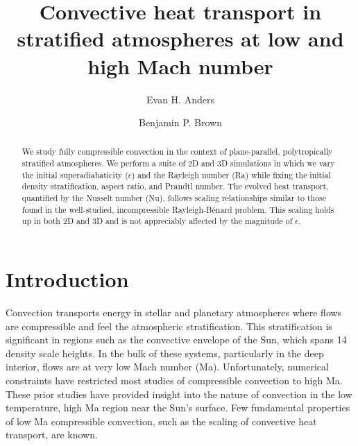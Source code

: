 \documentclass[aps, prfluids, onecolumn, notitlepage, nofootinbib, groupedaddress, amsfonts, amssymb, amsmath]{revtex4-1}
\begin{document}
\author{Evan H. Anders}
\author{Benjamin P. Brown}
\title{Convective heat transport in stratified atmospheres at low and high Mach number}

\begin{abstract}
We study fully compressible convection in the context of 
plane-parallel, polytropically stratified atmospheres. 
We perform a suite of 2D and 3D simulations in which we vary the initial
superadiabaticity ($\epsilon$) and the Rayleigh number (Ra) while fixing the
initial density stratification, aspect
ratio, and Prandtl number.
The evolved heat transport, 
quantified by the Nusselt number (Nu),
follows scaling relationships similar to those found in the well-studied, 
incompressible Rayleigh-B\'{e}nard problem.  This scaling holds up in both 2D and 3D and is not
appreciably affected by the magnitude of $\epsilon$. %
\end{abstract}
\maketitle


\section{Introduction}
\label{sec:intro}
Convection transports energy in stellar and planetary atmospheres
where flows are compressible and
feel the atmospheric stratification.  This stratification 
is significant in regions such as
the convective envelope of the Sun, which spans 14 density scale heights.
In the bulk of these systems, particularly in the deep interior,
flows are at very low Mach number (Ma).  Unfortunately,
numerical constraints have restricted most studies of 
compressible convection to high Ma.
These prior studies \cite{graham1975, chan&all1982,
hurlburt&all1984, cattaneo&all1990, brummell&all1996,
brandenburg&all2005} have provided insight into the nature of
convection in the low temperature,
high Ma region near the Sun's surface. Few fundamental
properties of low Ma compressible convection, such as the scaling of
convective heat transport, are known.
\end{document}
